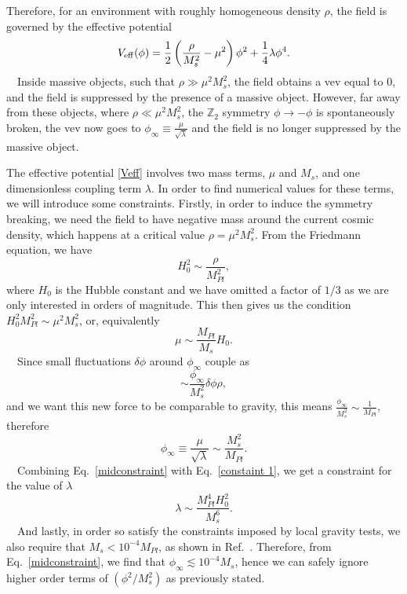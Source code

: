 \documentclass[nofootinbib,twocolumn]{revtex4}
\begin{document}
Therefore, for an environment with roughly homogeneous density $\rho$, the field is governed by the effective potential
\begin{equation}\label{Veff}
    V_{\rm eff}(\phi) = \frac{1}{2}\left(\frac{\rho}{M_s^2}-\mu^2 \right)\phi^2 +\frac{1}{4}\lambda\phi^4.
\end{equation}
~~Inside massive objects, such that $\rho \gg \mu^2M_s^2$, the field obtains a vev equal to 0, and the field is suppressed by the presence of a massive object. However, far away from these objects, where $\rho \ll \mu^2M_s^2$, the $\mathbb{Z}_2$ symmetry $\phi \to -\phi$ is spontaneously broken, the vev now goes to $\phi_{\infty} \equiv \frac{\mu}{\sqrt{\lambda}}$ and the field is no longer suppressed by the massive object.

The effective potential \eqref{Veff} involves two mass terms, $\mu$ and $M_s$, and one dimensionless coupling term $\lambda$.
In order to find numerical values for these terms, we will introduce some constraints. Firstly, in order to induce the symmetry breaking, we need the field to have negative mass around the current cosmic density, which happens at a critical value $\rho = \mu^2M_s^2$. From the Friedmann equation, we have 
\begin{equation}
    H_0^2 \sim \frac{\rho}{M_{Pl}^2},
    \label{Friedmann}
\end{equation}
where $H_0$ is the Hubble constant and we have omitted a factor of $1/3$ as we are only interested in orders of magnitude. This then gives us the condition $H_0^2 M_{Pl}^2 \sim \mu^2 M_s^2$, or, equivalently
\begin{equation}
    \mu \sim \frac{M_{Pl}}{M_s}H_0.
    \label{constaint 1}
\end{equation}
~~Since small fluctuations $\delta\phi$ around $\phi_{\infty}$ couple as \cite{Hinterbichler:2010es}
\begin{equation}
    \sim \frac{\phi_{\infty}}{M_s^2}\delta\phi\rho,
\end{equation}
and we want this new force to be comparable to gravity, this means $\frac{\phi_{\infty}}{M_s^2} \sim \frac{1}{M_{Pl}}$, therefore
\begin{equation}
    \phi_{\infty} \equiv \frac{\mu}{\sqrt{\lambda}} \sim \frac{M_s^2}{M_{Pl}}.
    \label{midconstraint}
\end{equation}
~~Combining Eq.~\eqref{midconstraint} with Eq.~\eqref{constaint 1}, we get a constraint for the value of $\lambda$
\begin{equation}
    \lambda \sim \frac{M_{Pl}^4H_0^2}{M_s^6}.
    \label{constraint 2}
\end{equation}
~~And lastly, in order so satisfy the constraints imposed by local gravity tests, we also require that $M_s < 10^{-4}M_{Pl}$, as shown in Ref.~\cite{Hinterbichler:2011ca}. Therefore, from Eq.~\eqref{midconstraint}, we find that $\phi_{\infty} \lesssim 10^{-4}M_s$, hence we can safely ignore higher order terms of $\left(\phi^2 / M_s^2\right)$ as previously stated.
\end{document}

